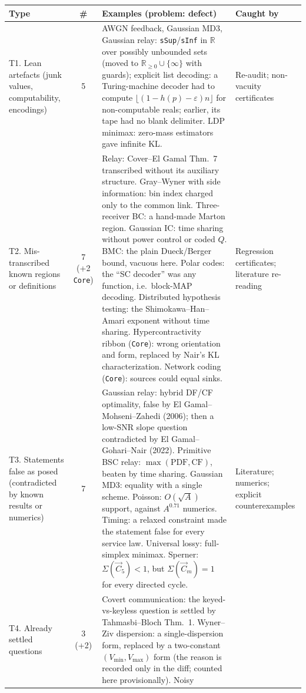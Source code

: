 \documentclass[11pt]{article}
\newcommand{\code}[1]{\texttt{#1}}
\begin{document}
\begin{table}[p]
\centering\footnotesize\sloppy
\begin{tabularx}{\textwidth}{>{\raggedright\arraybackslash}p{2.6cm}cL>{\raggedright\arraybackslash}p{2.3cm}}
\toprule
Type & \# & Examples (problem: defect) & Caught by\\
\midrule
T1. Lean artefacts (junk values, computability, encodings) & 5 &
AWGN feedback, Gaussian MD3, Gaussian relay: \code{sSup}/\code{sInf} in $\mathbb R$ over
possibly unbounded sets (moved to $\mathbb R_{\ge0}\cup\{\infty\}$ with guards); explicit list
decoding: a Turing-machine decoder had to compute $\lfloor(1-h(p)-\varepsilon)n\rfloor$ for
non-computable reals; earlier, its tape had no blank delimiter. LDP minimax: zero-mass
estimators gave infinite KL. &
Re-audit; non-vacuity certificates\\
T2. Mis-transcribed known regions or definitions & 7 (+2 \code{Core}) &
Relay: Cover--El Gamal Thm.~7 transcribed without its auxiliary structure. Gray--Wyner with side
information: bin index charged only to the common link. Three-receiver BC: a hand-made Marton
region. Gaussian IC: time sharing without power control or coded $Q$. BMC: the plain
Dueck/Berger bound, vacuous here. Polar codes: the ``SC decoder'' was any function, i.e.\
block-MAP decoding. Distributed hypothesis testing: the Shimokawa--Han--Amari exponent without time sharing. Hypercontractivity ribbon (\code{Core}): wrong orientation and form, replaced
by Nair's KL characterization. Network coding (\code{Core}): sources could equal sinks. &
Regression certificates; literature re-reading\\
T3. Statements false as posed (contradicted by known results or numerics) & 7 &
Gaussian relay: hybrid DF/CF optimality, false by El Gamal--Mohseni--Zahedi (2006); then a
low-SNR slope question contradicted by El Gamal--Gohari--Nair (2022). Primitive BSC relay:
$\max(\text{PDF},\text{CF})$, beaten by time sharing. Gaussian MD3: equality with a single
scheme. Poisson: $O(\sqrt A)$ support, against $A^{0.71}$ numerics. Timing: a relaxed constraint
made the statement false for every service law. Universal lossy: full-simplex minimax. Sperner:
$\Sigma(\vec C_5)<1$, but $\Sigma(\vec C_m)=1$ for every directed cycle. &
Literature; numerics; explicit counterexamples\\
T4. Already settled questions & 3 (+2) &
Covert communication: the keyed-vs-keyless question is settled by Tahmasbi--Bloch Thm.~1.
Wyner--Ziv dispersion: a single-dispersion form, replaced by a two-constant $(V_{\min},V_{\max})$ form (the reason is recorded only in the diff; counted here provisionally). Noisy

\end{tabularx}
\end{table}
\end{document}
